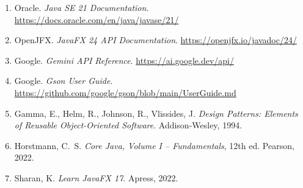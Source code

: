 \documentclass[12pt, a4paper, oneside]{report}
\begin{document}
\begin{enumerate}[leftmargin=2em, itemsep=6pt]
  \item Oracle. \textit{Java SE 21 Documentation}.
    \url{https://docs.oracle.com/en/java/javase/21/}

  \item OpenJFX. \textit{JavaFX 24 API Documentation}.
    \url{https://openjfx.io/javadoc/24/}

  \item Google. \textit{Gemini API Reference}.
    \url{https://ai.google.dev/api/}

  \item Google. \textit{Gson User Guide}.
    \url{https://github.com/google/gson/blob/main/UserGuide.md}

  \item Gamma, E., Helm, R., Johnson, R., Vlissides, J.
    \textit{Design Patterns: Elements of Reusable Object-Oriented Software}.
    Addison-Wesley, 1994.

  \item Horstmann, C.~S. \textit{Core Java, Volume I -- Fundamentals},
    12th ed. Pearson, 2022.

  \item Sharan, K. \textit{Learn JavaFX 17}. Apress, 2022.
\end{enumerate}
\end{document}
